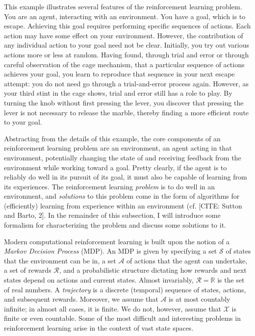 This example illustrates several features of the reinforcement learning problem.
You are an agent, interacting with an environment.
You have a goal, which is to escape.
Achieving this goal requires performing specific sequences of actions.
Each action may have some effect on your environment.
However, the contribution of any individual action to your goal need not be clear.
Initially, you try out various actions more or less at random.
Having found, through trial and error or through careful observation of the cage mechanism, that a particular sequence of actions achieves your goal, you learn to reproduce that sequence in your next escape attempt: you do not need go through a trial-and-error process again.
However, as your third stint in the cage shows, trial and error still has a role to play.
By turning the knob without first pressing the lever, you discover that pressing the lever is not necessary to release the marble, thereby finding a more efficient route to your goal.

Abstracting from the details of this example, the core components of an reinforcement learning problem are an environment, an agent acting in that environment, potentially changing the state of and receiving feedback from the environment while working toward a goal.
Pretty clearly, if the agent is to reliably do well in its pursuit of its goal, it must also be capable of learning from its experiences.
The reinforcement learning \emph{problem} is to do well in an environment, and \emph{solutions} to this problem come in the form of algorithms for (efficiently) learning from experience within an environment (cf. [CITE: Sutton and Barto, 2].
In the remainder of this subsection, I will introduce some formalism for characterizing the problem and discuss some solutions to it.

Modern computational reinforcement learning is built upon the notion of a \emph{Markov Decision Process} (MDP).
An MDP is given by specifying a set $\mathcal S$ of states that the environment can be in, a set $\mathcal A$ of actions that the agent can undertake, a set of rewards $\mathcal R$, and a probabilistic structure dictating how rewards and next states depend on actions and current states.
Almost invariably, $\mathcal R = \mathbb R$ is the set of real numbers.
A \emph{trajectory} is a discrete (temporal) sequence of states, actions, and subsequent rewards.
Moreover, we assume that $\mathcal A$ is at most countably infinite; in almost all cases, it is finite.
We do not, however, assume that $\mathcal X$ is finite or even countable.
Some of the most difficult and interesting problems in reinforcement learning arise in the context of vast state spaces.

